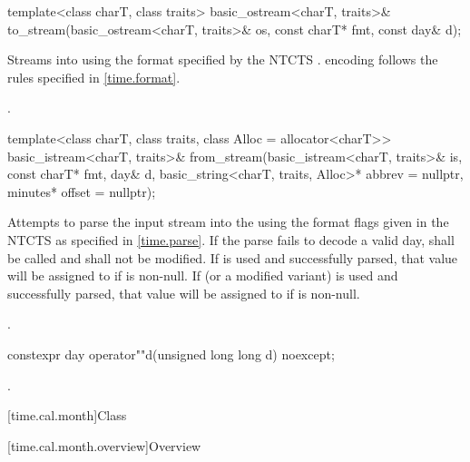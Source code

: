 %
\begin{itemdecl}
template<class charT, class traits>
  basic_ostream<charT, traits>&
    to_stream(basic_ostream<charT, traits>& os, const charT* fmt, const day& d);
\end{itemdecl}

\begin{itemdescr}
\pnum
\effects
Streams  into  using
the format specified by the NTCTS .
 encoding follows the rules specified in \ref{time.format}.

\pnum
\returns {}.
\end{itemdescr}

%
\begin{itemdecl}
template<class charT, class traits, class Alloc = allocator<charT>>
  basic_istream<charT, traits>&
    from_stream(basic_istream<charT, traits>& is, const charT* fmt,
                day& d, basic_string<charT, traits, Alloc>* abbrev = nullptr,
                minutes* offset = nullptr);
\end{itemdecl}

\begin{itemdescr}
\pnum
\effects
Attempts to parse the input stream 
into the   using
the format flags given in the NTCTS 
as specified in \ref{time.parse}.
If the parse fails to decode a valid day,
 shall be called
and  shall not be modified.
If  is used and successfully parsed,
that value will be assigned to  if  is non-null.
If  (or a modified variant) is used and successfully parsed,
that value will be assigned to  if  is non-null.

\pnum
\returns {}.
\end{itemdescr}

%
\begin{itemdecl}
constexpr day operator""d(unsigned long long d) noexcept;
\end{itemdecl}

\begin{itemdescr}
\pnum
\returns {}.
\end{itemdescr}

[time.cal.month]{Class }

[time.cal.month.overview]{Overview}

